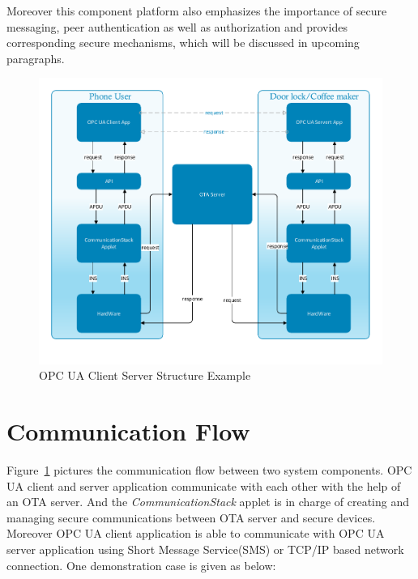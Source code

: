 Moreover this component platform also emphasizes the importance of secure messaging, peer authentication as well as authorization and provides corresponding secure mechanisms, which will be discussed in upcoming paragraphs.

 \begin{figure}[!htb]
	\centering
	\includegraphics[width=1.1\textwidth]{csoverview}
		\caption{OPC UA Client Server Structure Example}
	\label{fig:softwareStructure}
\end{figure}

\section{Communication Flow}
Figure~\ref{fig:softwareStructure} pictures the communication flow between two system components. OPC UA client and server application communicate with each other with the help of an OTA server. And the \emph{CommunicationStack} applet is in charge of creating and managing secure communications between OTA server and secure devices. Moreover OPC UA client application is able to communicate with OPC UA server application using Short Message Service(SMS) or TCP/IP based network connection. One demonstration case is given as below:

